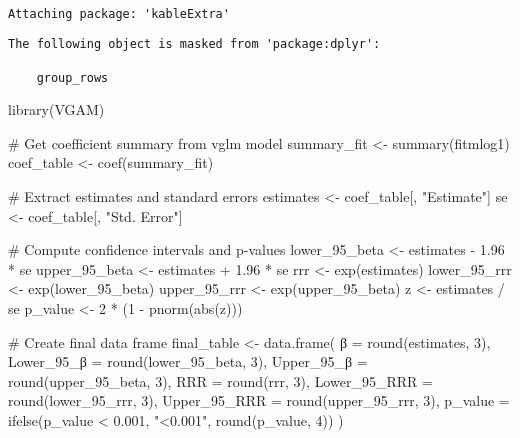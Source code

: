 \documentclass[
  letterpaper,
  DIV=11,
  numbers=noendperiod]{scrartcl}
\newenvironment{Shaded}{\begin{snugshade}}{\end{snugshade}}
\newcommand{\AttributeTok}[1]{\textcolor[rgb]{0.40,0.45,0.13}{#1}}
\newcommand{\CommentTok}[1]{\textcolor[rgb]{0.37,0.37,0.37}{#1}}
\newcommand{\DecValTok}[1]{\textcolor[rgb]{0.68,0.00,0.00}{#1}}
\newcommand{\FloatTok}[1]{\textcolor[rgb]{0.68,0.00,0.00}{#1}}
\newcommand{\FunctionTok}[1]{\textcolor[rgb]{0.28,0.35,0.67}{#1}}
\newcommand{\NormalTok}[1]{\textcolor[rgb]{0.00,0.23,0.31}{#1}}
\newcommand{\OtherTok}[1]{\textcolor[rgb]{0.00,0.23,0.31}{#1}}
\newcommand{\SpecialCharTok}[1]{\textcolor[rgb]{0.37,0.37,0.37}{#1}}
\newcommand{\StringTok}[1]{\textcolor[rgb]{0.13,0.47,0.30}{#1}}
\begin{document}
\begin{verbatim}

Attaching package: 'kableExtra'
\end{verbatim}

\begin{verbatim}
The following object is masked from 'package:dplyr':

    group_rows
\end{verbatim}

\begin{Shaded}
\begin{Highlighting}[]
\FunctionTok{library}\NormalTok{(VGAM)}

\CommentTok{\#  Get coefficient summary from  vglm model}
\NormalTok{summary\_fit }\OtherTok{\textless{}{-}} \FunctionTok{summary}\NormalTok{(fitmlog1)}
\NormalTok{coef\_table }\OtherTok{\textless{}{-}} \FunctionTok{coef}\NormalTok{(summary\_fit)}

\CommentTok{\#  Extract estimates and standard errors}
\NormalTok{estimates }\OtherTok{\textless{}{-}}\NormalTok{ coef\_table[, }\StringTok{"Estimate"}\NormalTok{]}
\NormalTok{se }\OtherTok{\textless{}{-}}\NormalTok{ coef\_table[, }\StringTok{"Std. Error"}\NormalTok{]}

\CommentTok{\#  Compute confidence intervals and p{-}values}
\NormalTok{lower\_95\_beta }\OtherTok{\textless{}{-}}\NormalTok{ estimates }\SpecialCharTok{{-}} \FloatTok{1.96} \SpecialCharTok{*}\NormalTok{ se}
\NormalTok{upper\_95\_beta }\OtherTok{\textless{}{-}}\NormalTok{ estimates }\SpecialCharTok{+} \FloatTok{1.96} \SpecialCharTok{*}\NormalTok{ se}
\NormalTok{rrr }\OtherTok{\textless{}{-}} \FunctionTok{exp}\NormalTok{(estimates)}
\NormalTok{lower\_95\_rrr }\OtherTok{\textless{}{-}} \FunctionTok{exp}\NormalTok{(lower\_95\_beta)}
\NormalTok{upper\_95\_rrr }\OtherTok{\textless{}{-}} \FunctionTok{exp}\NormalTok{(upper\_95\_beta)}
\NormalTok{z }\OtherTok{\textless{}{-}}\NormalTok{ estimates }\SpecialCharTok{/}\NormalTok{ se}
\NormalTok{p\_value }\OtherTok{\textless{}{-}} \DecValTok{2} \SpecialCharTok{*}\NormalTok{ (}\DecValTok{1} \SpecialCharTok{{-}} \FunctionTok{pnorm}\NormalTok{(}\FunctionTok{abs}\NormalTok{(z)))}

\CommentTok{\# Create final data frame}
\NormalTok{final\_table }\OtherTok{\textless{}{-}} \FunctionTok{data.frame}\NormalTok{(}
\NormalTok{  β }\OtherTok{=} \FunctionTok{round}\NormalTok{(estimates, }\DecValTok{3}\NormalTok{),}
\NormalTok{  Lower\_95\_β }\OtherTok{=} \FunctionTok{round}\NormalTok{(lower\_95\_beta, }\DecValTok{3}\NormalTok{),}
\NormalTok{  Upper\_95\_β }\OtherTok{=} \FunctionTok{round}\NormalTok{(upper\_95\_beta, }\DecValTok{3}\NormalTok{),}
  \AttributeTok{RRR =} \FunctionTok{round}\NormalTok{(rrr, }\DecValTok{3}\NormalTok{),}
  \AttributeTok{Lower\_95\_RRR =} \FunctionTok{round}\NormalTok{(lower\_95\_rrr, }\DecValTok{3}\NormalTok{),}
  \AttributeTok{Upper\_95\_RRR =} \FunctionTok{round}\NormalTok{(upper\_95\_rrr, }\DecValTok{3}\NormalTok{),}
  \AttributeTok{p\_value =} \FunctionTok{ifelse}\NormalTok{(p\_value }\SpecialCharTok{\textless{}} \FloatTok{0.001}\NormalTok{, }\StringTok{"\textless{}0.001"}\NormalTok{, }\FunctionTok{round}\NormalTok{(p\_value, }\DecValTok{4}\NormalTok{))}
\NormalTok{)}


\end{Highlighting}
\end{Shaded}
\end{document}
